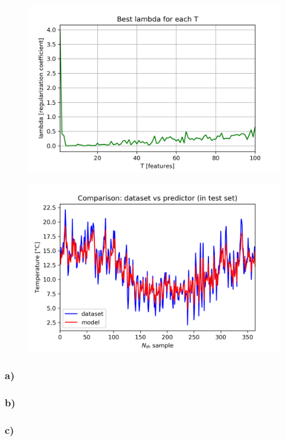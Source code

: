 \documentclass[a4paper]{article}
\begin{document}
\begin{figure}[ht]
    \centering
    \includegraphics[width=12cm]{figure_3_lambda_with_T}
    \caption{}
    \label{fig:ex2-3}
\end{figure}

\begin{figure}[ht]
    \centering
    \includegraphics[width=12cm]{figure_4_predictor}
    \caption{}
    \label{fig:ex2-4}
\end{figure}

\subsubsection{a) }

\subsubsection{b) }

\subsubsection{c) }

\end{document}
